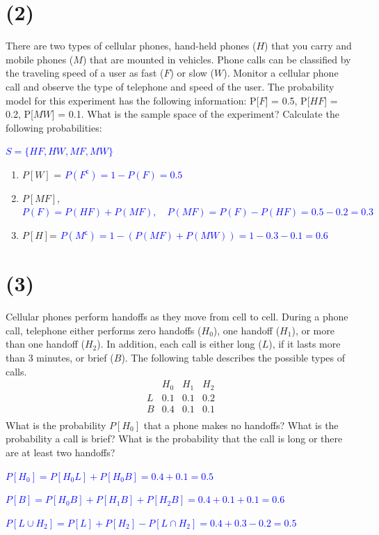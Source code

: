 \documentclass[12pt]{article}
\begin{document}
\section*{(2)}
There are two types of cellular phones, hand-held phones ($H$) that you carry
and mobile phones ($M$) that are mounted in vehicles. Phone calls can be classified by
the traveling speed of a user as fast ($F$) or slow ($W$). Monitor a cellular phone call and
observe the type of telephone and speed of the user. The probability model for this
experiment has the following information: P[$F$] = 0.5, P[$HF$] = 0.2, P[$MW$] = 0.1.
What is the sample space of the experiment? Calculate the following probabilities:
 
\textcolor{blue}{$S = \{HF, HW, MF, MW\}$}
\begin{enumerate}
    \item[a] \(P[W]\) = \textcolor{blue}{$P(F^\mathsf{c})= 1 - P(F)= 0.5$}
    \item[b] \(P[MF]\), \textcolor{blue}{$P(F) = P(HF)+P(MF),\quad P(MF)=P(F)-P(HF)=0.5-0.2=0.3$}
    \item[c] \(P[H]\)= \textcolor{blue}{$P(M^\mathsf{c})= 1- (P(MF)+P(MW)) = 1-0.3-0.1=0.6$}
\end{enumerate}

\section*{(3)}
Cellular phones perform handoffs as they move from cell to cell. During a
phone call, telephone either performs zero handoffs ($H_0$), one handoff ($H_1$), or more
than one handoff ($H_2$). In addition, each call is either long ($L$), if it lasts more than 3
minutes, or brief ($B$). The following table describes the possible types of calls.
\[
\begin{array}{c|ccc}
 & H_0 & H_1 & H_2 \\ \hline
L & 0.1 & 0.1 & 0.2 \\
B & 0.4 & 0.1 & 0.1 \\
\end{array}
\]
What is the probability $P[H_0]$ that a phone makes no handoffs? What is the probability
a call is brief? What is the probability that the call is long or there are at least two
handoffs?

\textcolor{blue}{$P[H_0]=P[H_0L]+P[H_0B]=0.4+0.1=0.5$}

\textcolor{blue}{$P[B]=P[H_0B]+P[H_1B]+P[H_2B]=0.4+0.1+0.1=0.6$}

\textcolor{blue}{$P[L \cup H_2]=P[L]+P[H_2]-P[L\cap H_2] = 0.4 + 0.3 -0.2 = 0.5$}
\end{document}
